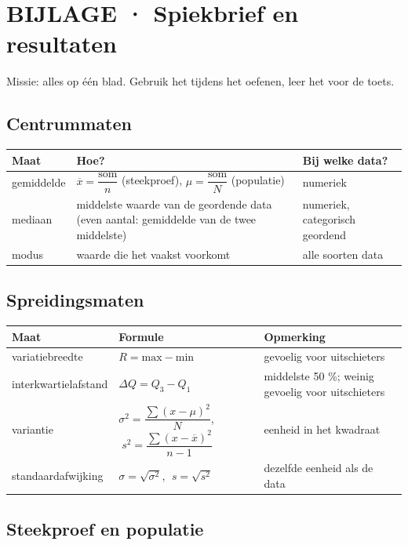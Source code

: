 \section{BIJLAGE · Spiekbrief en resultaten}

\begin{missie}
Missie: alles op één blad. Gebruik het tijdens het oefenen, leer het voor de toets.
\end{missie}

\subsection*{Centrummaten}

\begin{tabular}{lll}
\hline
Maat & Hoe? & Bij welke data? \\
\hline
gemiddelde & $\overline{x}=\dfrac{\text{som}}{n}$ (steekproef), $\mu=\dfrac{\text{som}}{N}$ (populatie) & numeriek \\
mediaan & middelste waarde van de geordende data (even aantal: gemiddelde van de twee middelste) & numeriek, categorisch geordend \\
modus & waarde die het vaakst voorkomt & alle soorten data \\
\hline
\end{tabular}

\subsection*{Spreidingsmaten}

\begin{tabular}{lll}
\hline
Maat & Formule & Opmerking \\
\hline
variatiebreedte & $R=\text{max}-\text{min}$ & gevoelig voor uitschieters \\
interkwartielafstand & $\Delta Q=Q_3-Q_1$ & middelste 50 \%; weinig gevoelig voor uitschieters \\
variantie & $\sigma^2=\dfrac{\sum (x-\mu)^2}{N}$, $\;s^2=\dfrac{\sum (x-\overline{x})^2}{n-1}$ & eenheid in het kwadraat \\
standaardafwijking & $\sigma=\sqrt{\sigma^2}$, $\;s=\sqrt{s^2}$ & dezelfde eenheid als de data \\
\hline
\end{tabular}

\subsection*{Steekproef en populatie}

